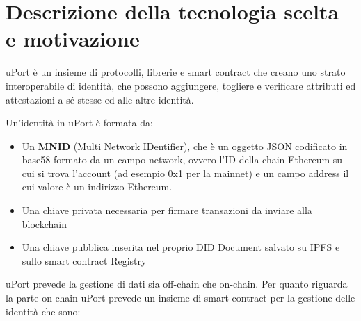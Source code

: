 \section{Descrizione della tecnologia scelta e motivazione}
uPort è un insieme di protocolli, librerie e smart contract che creano uno strato interoperabile di identità, che possono aggiungere, togliere e verificare attributi ed attestazioni a sé stesse ed alle altre identità.

Un’identità in uPort è formata da:

\begin{itemize}
  \item Un \textbf{MNID} (Multi Network IDentifier), che è un oggetto JSON codificato in base58 formato da un campo network, ovvero l’ID della chain Ethereum su cui si trova l’account
  (ad esempio 0x1 per la mainnet) e un campo address il cui valore è un indirizzo Ethereum.
  \item Una chiave privata necessaria per firmare transazioni da inviare alla blockchain
  \item Una chiave pubblica inserita nel proprio DID Document salvato su IPFS e sullo smart contract Registry
\end{itemize}

uPort prevede la gestione di dati sia off-chain che on-chain. 
Per quanto riguarda la parte on-chain uPort prevede un insieme di smart contract per la gestione delle identità che sono:


